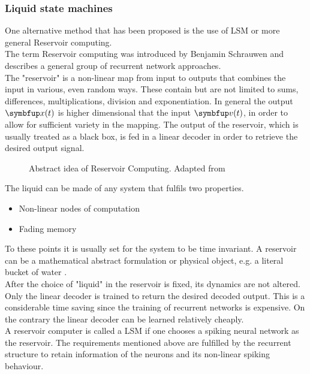 \subsubsection{Liquid state machines}
One alternative method that has been proposed is the use of \ac{LSM} or more general Reservoir computing.\\
The term Reservoir computing was introduced by Benjamin Schrauwen and describes a general group of recurrent network approaches\cite{verstraeten_experimental_2007}.\\
The "reservoir" is a non-linear map from input to outputs that combines the input in various, even random ways. These contain but are not limited to sums, differences, multiplications, division and exponentiation. In general the output $\bmu{x}(t)$ is higher dimensional that the input $\bmu{v}(t)$, in order to allow for sufficient variety in the mapping. The output of the reservoir, which is usually treated as a black box, is fed in a linear decoder in order to retrieve the desired output signal.\\
\begin{figure}
	\centering
	
	\caption{Abstract idea of Reservoir Computing. Adapted from \cite{cooper_liquid_2011}}
	\label{fig:reservoir_computing}
\end{figure}
The liquid can be made of any system that fulfils two properties.\\
\begin{itemize}
	\item Non-linear nodes of computation
	\item Fading memory
\end{itemize}
To these points it is usually set for the system to be time invariant\cite{cooper_liquid_2011}.
A reservoir can be a mathematical abstract formulation or physical object, e.g. a literal bucket of water \cite{tanaka_recent_2019}.\\
After the choice of "liquid" in the reservoir is fixed, its dynamics are not altered. Only the linear decoder is trained to return the desired decoded output\cite{jaeger_echo_2010}. This is a considerable time saving since the training of recurrent networks is expensive. On the contrary the linear decoder can be learned relatively cheaply.\\
A reservoir computer is called a \ac{LSM} if one chooses a spiking neural network as the reservoir. The requirements mentioned above are fulfilled by the recurrent structure to retain information of the neurons and its non-linear spiking behaviour.\\
